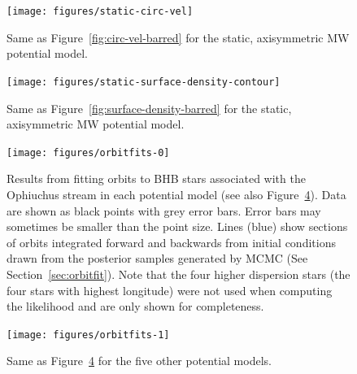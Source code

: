 \documentclass[letterpaper,12pt,preprint]{aastex}
\begin{document}
\clearpage
\begin{figure}[p]
\begin{center}
\texttt{[image: figures/static-circ-vel]}
\caption{Same as Figure~\ref{fig:circ-vel-barred} for the static, axisymmetric MW potential model. }
\label{fig:circ-vel-static}
\end{center}
\end{figure}

\clearpage
\begin{figure}[p]
\begin{center}
\texttt{[image: figures/static-surface-density-contour]}
\caption{Same as Figure~\ref{fig:surface-density-barred} for the static, axisymmetric MW potential model. }
\label{fig:surface-density-static}
\end{center}
\end{figure}

\clearpage
\begin{figure}[p]
\begin{center}
\texttt{[image: figures/orbitfits-0]}
\caption{ Results from fitting orbits to BHB stars associated with the Ophiuchus stream in each potential model (see also Figure~\ref{fig:orbitfits2}). Data are shown as black points with grey error bars. Error bars may sometimes be smaller than the point size. Lines (blue) show sections of orbits integrated forward and backwards from initial conditions drawn from the posterior samples generated by MCMC (See Section~\ref{sec:orbitfit}). Note that the four higher dispersion stars (the four stars with highest longitude) were not used when computing the likelihood and are only shown for completeness. }
\label{fig:orbitfits1}
\end{center}
\end{figure}

\clearpage
\begin{figure}[p]
\begin{center}
\texttt{[image: figures/orbitfits-1]}
\caption{Same as Figure~\ref{fig:orbitfits2} for the five other potential models.}
\label{fig:orbitfits2}
\end{center}
\end{figure}
\end{document}
